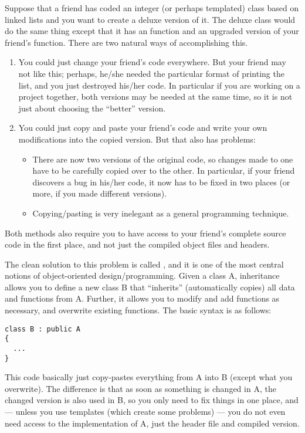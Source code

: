 Suppose that a friend has coded an integer (or perhaps templated) 
class based on linked lists and you want to create a deluxe version of it. 
The deluxe class  would do the same thing
except that it has an  function and an upgraded
version of your friend's  function.
There are two natural ways of accomplishing this. 
\begin{enumerate}
\item You could just change your friend's code everywhere. But your
  friend may not like this; perhaps, he/she needed the particular format
  of printing the list, and you just destroyed his/her code.
  In particular if you are working on a project together,
  both versions may be needed at the same time,
  so it is not just about choosing the ``better'' version.
\item You could just copy and paste your friend's code and write your own
  modifications into the copied version. But that also has problems:

\begin{itemize}
\item There are now two versions of the original code, so changes made
  to one have to be carefully copied over to the other.
  In particular, if your friend discovers a bug in his/her code,
  it now has to be fixed in two places (or more, if you made different versions).
\item Copying/pasting is very inelegant as a general programming
  technique.
\end{itemize}
\end{enumerate}

Both methods also require you to have access to your friend's complete source
code in the first place, and not just the compiled object files and headers.

The clean solution to this problem is called ,
and it is one of the most central notions of object-oriented design/programming.
Given a class A, inheritance allows you to define a new class B that
``inherits'' (automatically copies) all data and functions from A. 
Further, it allows you to modify and add functions as necessary, and
overwrite existing functions. The basic syntax is as follows: 

\begin{verbatim}
class B : public A
{
  ...
}

\end{verbatim}
This code basically just copy-pastes everything from A into B
(except what you overwrite).
The difference is that as soon as something is changed in A,
the changed version is also used in B,
so you only need to fix things in one place, and
--- unless you use templates (which create some problems) ---
you do not even need access to the implementation of A, just the
header file and compiled version.

